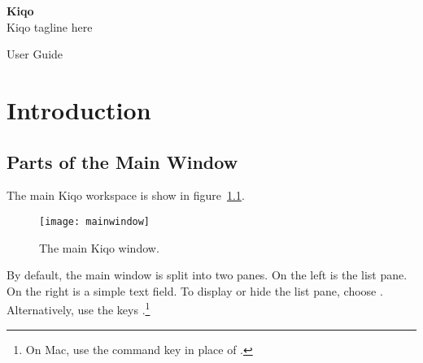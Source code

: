 \documentclass[11pt,fleqn]{book} %
\begin{document}

\begingroup
\thispagestyle{empty}
\centering
\vspace*{5cm}
\par\normalfont\fontsize{35}{35}\sffamily\selectfont
\textbf{Kiqo}\\
{\LARGE Kiqo tagline here}\par %
\vspace*{1cm}
{\Huge User Guide}\par %
\endgroup


\tableofcontents %


\chapter{Introduction}

\section{Parts of the Main Window}
The main Kiqo workspace is show in figure~\ref{fig:mainwindow}.

\begin{figure}[h]
  \centering
  \texttt{[image: mainwindow]}
  \caption{The main Kiqo window.\label{fig:mainwindow}}
\end{figure}

\pagebreak
By default, the main window is split into two panes.
On the left is the list pane.
On the right is a simple text field.
To display or hide the list pane, choose .
Alternatively, use the keys .\footnote{On Mac,
use the command key \keys{\cmd} in place of \keys{\ctrl}.}
\end{document}
